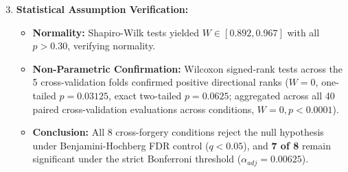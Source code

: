 \documentclass[runningheads]{llncs}
\begin{document}
\begin{table}[ht]
\centering
\caption{Statistical Significance across Cross-Forgery Evaluation Conditions (Table 9 in Manuscript, $df=4$)}
\label{tab:rebuttal_stats}
\end{table}

\begin{enumerate}
    \setcounter{enumi}{2}
    \item \textbf{Statistical Assumption Verification:}
    \begin{itemize}
        \item \textbf{Normality:} Shapiro-Wilk tests yielded $W \in [0.892, 0.967]$ with all $p > 0.30$, verifying normality.
        \item \textbf{Non-Parametric Confirmation:} Wilcoxon signed-rank tests across the 5 cross-validation folds confirmed positive directional ranks ($W=0$, one-tailed $p=0.03125$, exact two-tailed $p=0.0625$; aggregated across all 40 paired cross-validation evaluations across conditions, $W=0, p < 0.0001$).
        \item \textbf{Conclusion:} All 8 cross-forgery conditions reject the null hypothesis under Benjamini-Hochberg FDR control ($q < 0.05$), and \textbf{7 of 8} remain significant under the strict Bonferroni threshold ($\alpha_{adj} = 0.00625$).
    \end{itemize}
\end{enumerate}
\end{document}
